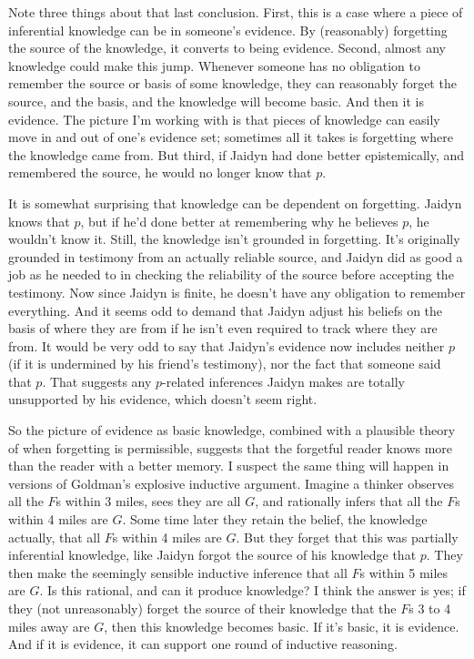 \documentclass[11pt,]{book}
\begin{document}
Note three things about that last conclusion. First, this is a case where a piece of inferential knowledge can be in someone's evidence. By (reasonably) forgetting the source of the knowledge, it converts to being evidence. Second, almost any knowledge could make this jump. Whenever someone has no obligation to remember the source or basis of some knowledge, they can reasonably forget the source, and the basis, and the knowledge will become basic. And then it is evidence. The picture I'm working with is that pieces of knowledge can easily move in and out of one's evidence set; sometimes all it takes is forgetting where the knowledge came from. But third, if Jaidyn had done better epistemically, and remembered the source, he would no longer know that \(p\).

It is somewhat surprising that knowledge can be dependent on forgetting. Jaidyn knows that \(p\), but if he'd done better at remembering why he believes \(p\), he wouldn't know it. Still, the knowledge isn't grounded in forgetting. It's originally grounded in testimony from an actually reliable source, and Jaidyn did as good a job as he needed to in checking the reliability of the source before accepting the testimony. Now since Jaidyn is finite, he doesn't have any obligation to remember everything. And it seems odd to demand that Jaidyn adjust his beliefs on the basis of where they are from if he isn't even required to track where they are from. It would be very odd to say that Jaidyn's evidence now includes neither \(p\) (if it is undermined by his friend's testimony), nor the fact that someone said that \(p\). That suggests any \(p\)-related inferences Jaidyn makes are totally unsupported by his evidence, which doesn't seem right.

So the picture of evidence as basic knowledge, combined with a plausible theory of when forgetting is permissible, suggests that the forgetful reader knows more than the reader with a better memory. I suspect the same thing will happen in versions of Goldman's explosive inductive argument. Imagine a thinker observes all the \(F\)s within 3 miles, sees they are all \(G\), and rationally infers that all the \(F\)s within 4 miles are \(G\). Some time later they retain the belief, the knowledge actually, that all \(F\)s within 4 miles are \(G\). But they forget that this was partially inferential knowledge, like Jaidyn forgot the source of his knowledge that \(p\). They then make the seemingly sensible inductive inference that all \(F\)s within 5 miles are \(G\). Is this rational, and can it produce knowledge? I think the answer is yes; if they (not unreasonably) forget the source of their knowledge that the \(F\)s 3 to 4 miles away are \(G\), then this knowledge becomes basic. If it's basic, it is evidence. And if it is evidence, it can support one round of inductive reasoning.
\end{document}
